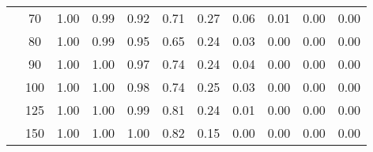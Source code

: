 \begin{table}[t]
\begin{center}
\begin{subtable}[c]{\textwidth}
\begin{center}
\begin{tabular}{rcccccccccc}
                                        & \multicolumn{1}{c|}{70}  & \num{1.00}  & \num{0.99}  & \num{0.92}  & \num{0.71}  & \num{0.27}  & \num{0.06}  & \num{0.01}  & \num{0.00}  & \num{0.00}  \\
                                        & \multicolumn{1}{c|}{80}  & \num{1.00}  & \num{0.99}  & \num{0.95}  & \num{0.65}  & \num{0.24}  & \num{0.03}  & \num{0.00}  & \num{0.00}  & \num{0.00}  \\
                                        & \multicolumn{1}{c|}{90}  & \num{1.00}  & \num{1.00}  & \num{0.97}  & \num{0.74}  & \num{0.24}  & \num{0.04}  & \num{0.00}  & \num{0.00}  & \num{0.00}  \\
                                        & \multicolumn{1}{c|}{100}  & \num{1.00}  & \num{1.00}  & \num{0.98}  & \num{0.74}  & \num{0.25}  & \num{0.03}  & \num{0.00}  & \num{0.00}  & \num{0.00}  \\
                                        & \multicolumn{1}{c|}{125}  & \num{1.00}  & \num{1.00}  & \num{0.99}  & \num{0.81}  & \num{0.24}  & \num{0.01}  & \num{0.00}  & \num{0.00}  & \num{0.00}  \\
                                        & \multicolumn{1}{c|}{150}  & \num{1.00}  & \num{1.00}  & \num{1.00}  & \num{0.82}  & \num{0.15}  & \num{0.00}  & \num{0.00}  & \num{0.00}  & \num{0.00}  \\
                                    \end{tabular}
            \end{center}
        \end{subtable}

        \vspace{5mm}


\end{center}
\end{table}
